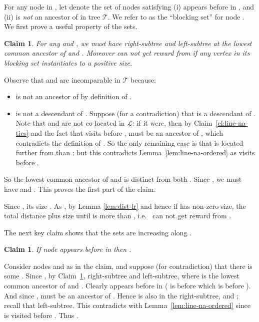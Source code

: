 \documentclass[11pt,letterpaper]{article}
\newtheorem{claim}[theorem]{Claim}
\numberwithin{algorithm}{section}
\newenvironment{proof}{

\noindent{\bf Proof:}}
{\hfill


}
\newcommand{\lm}[0]{{\ensuremath{\mathcal{L}}}\xspace}
\newcommand{\T}{\ensuremath{\mathcal{T}}\xspace}
\begin{document}
For any node  in , let  denote the set of nodes  satisfying (i)  appears before  in , and (ii)  is {\em not} an ancestor of  in tree \T. We refer to  as the ``blocking set'' for node . We first prove a useful property of the   sets.
\begin{claim}\label{cl:line-E-prop}
For any  and , we must have  right-subtree and  left-subtree at the lowest common ancestor  of  and . Moreover  can not get reward from  if any vertex in its blocking set  instantiates to a positive size.
\end{claim}
\begin{proof}
Observe that  and  are incomparable in \T because:
\begin{itemize}
\item  is not an ancestor of  by definition of .
\item  is not a descendant of . Suppose (for a contradiction) that  is a descendant of . Note that  and  are not co-located in \lm: if it were, then by  Claim~\ref{cl:line-na-ties} and the fact that  visits  before ,  must be an ancestor of , which contradicts the definition of . So the only remaining case is that  is located further from  than : but this contradicts Lemma~\ref{lem:line-na-ordered} as  visits  before .
\end{itemize}
So the lowest common ancestor  of  and  is distinct from both . Since , we must have  and . This proves the first part of the claim.

Since , its size .
As , by Lemma \ref{lem:dist-lr}   and hence if  has non-zero size, the total distance plus size until  is more than , i.e.~ can not get reward from .
\end{proof}

The next key claim shows that the sets  are increasing along .
\begin{claim}\label{cl:inc-E}
If node  appears before  in  then .
\end{claim}
\begin{proof}
Consider nodes  and  as in the claim, and suppose (for contradiction) that there is some . Since , by Claim~\ref{cl:line-E-prop},  right-subtree and  left-subtree, where  is the lowest common ancestor of  and . Clearly  appears before  in  ( is before  which is before ). And since ,  must be an ancestor of . Hence  is also in the right-subtree, and ;  recall that  left-subtree. This contradicts with Lemma~\ref{lem:line-na-ordered} since  is visited before . Thus .
\end{proof}
\end{document}
